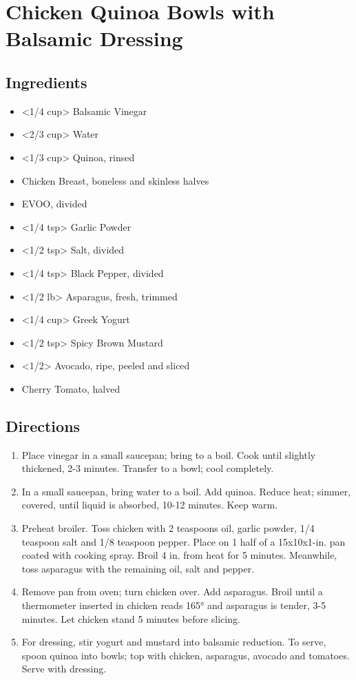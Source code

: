 \section{Chicken Quinoa Bowls with Balsamic Dressing}

\subsection{ Ingredients }

\begin{itemize}
  \item <1/4 cup> Balsamic Vinegar
  \item <2/3 cup> Water
  \item <1/3 cup> Quinoa, rinsed
  \item <12 oz> Chicken Breast, boneless and skinless halves
  \item <3 tsp> EVOO, divided
  \item <1/4 tsp> Garlic Powder
  \item <1/2 tsp> Salt, divided
  \item <1/4 tsp> Black Pepper, divided
  \item <1/2 lb> Asparagus, fresh, trimmed
  \item <1/4 cup> Greek Yogurt
  \item <1/2 tsp> Spicy Brown Mustard
  \item <1/2> Avocado, ripe, peeled and sliced
  \item <6> Cherry Tomato, halved
\end{itemize}

\subsection{ Directions }

\begin{enumerate}
  \item Place vinegar in a small saucepan; bring to a boil. Cook until slightly thickened, 2-3 minutes. Transfer to a bowl; cool completely.
  \item In a small saucepan, bring water to a boil. Add quinoa. Reduce heat; simmer, covered, until liquid is absorbed, 10-12 minutes. Keep warm.
  \item Preheat broiler. Toss chicken with 2 teaspoons oil, garlic powder, 1/4 teaspoon salt and 1/8 teaspoon pepper. Place on 1 half of a 15x10x1-in. pan coated with cooking spray. Broil 4 in. from heat for 5 minutes. Meanwhile, toss asparagus with the remaining oil, salt and pepper.
  \item Remove pan from oven; turn chicken over. Add asparagus. Broil until a thermometer inserted in chicken reads 165° and asparagus is tender, 3-5 minutes. Let chicken stand 5 minutes before slicing.
  \item For dressing, stir yogurt and mustard into balsamic reduction. To serve, spoon quinoa into bowls; top with chicken, asparagus, avocado and tomatoes. Serve with dressing.
\end{enumerate}

